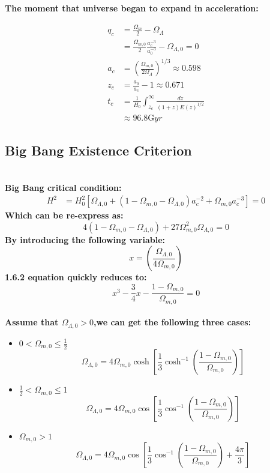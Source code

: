 \documentclass[14pt]{article}
\begin{document}
\textbf{The moment that universe began to expand in acceleration:}

\begin{align*}
    q_{c}&=\frac{\Omega_{m}}{2}-\Omega_{\Lambda}\\
    &=\frac{\Omega_{m,0}}{2}\frac{a^{-3}_{c}}{a^{-3}_{0}}-\Omega_{\Lambda,0}=0\tag{1.5.6}\\
    a_{c}&=\displaystyle(\frac{\Omega_{m,0}}{2\Omega_{\Lambda}})^{1/3} \approx 0.598 \tag{1.5.7}\\
    z_{c}&=\frac{a_{0}}{a_{c}}-1\approx 0.671 \tag{1.5.8}\\
     t_{c}&=\frac{1}{H_{0}}\int^{\infty}_{z_{c}}\displaystyle\frac{dz}{(1+z)E(z)^{1/2}}\\
      &\approx 96.8 \mathrm{G} yr\tag{1.5.9}
\end{align*}
\subsection{Big Bang Existence Criterion\cite{GRAIfPh1}}
\quad\\
\textbf{Big Bang critical condition:}
\begin{align*}
H^{2}&=H^{2}_{0}[\Omega_{\Lambda,0}+(1-\Omega_{m,0}-\Omega_{\Lambda,0})a^{-2}_{c}+\Omega_{m,0}a^{-3}_{c}]=0\tag{1.6.1}
\end{align*}
\textbf{Which can be re-express as:}
\[
4(1-\Omega_{m,0}-\Omega_{\Lambda,0})+27\Omega_{m,0}^{2}\Omega_{\Lambda,0}=0\tag{1.6.2}
\]
\textbf{By introducing the following variable:}
\[
x=\displaystyle(\frac{\Omega_{\Lambda,0}}{4\Omega_{m,0}})\tag{1.6.3}
\]
\textbf{1.6.2 equation quickly reduces to:}
\[
x^{3}-\frac{3}{4}x-\frac{1-\Omega_{m,0}}{\Omega_{m,0}}=0\tag{1.6.4}
\]
\quad\\
\textbf{Assume that $\Omega_{\Lambda,0}>0$,we can get the following three cases:}

\begin{itemize}
    \item $0<\Omega_{m,0}\le \displaystyle\frac{1}{2}$\\
    \[\Omega_{\Lambda,0}=4\Omega_{m,0}\cosh[\frac{1}{3}\cosh^{-1}(\frac{1-\Omega_{m,0}}{\Omega_{m,0}})]\tag{1.6.5}\]
    \item $\displaystyle\frac{1}{2}<\Omega_{m,0}\le 1$\\
     \[\Omega_{\Lambda,0}=4\Omega_{m,0}\cos[\frac{1}{3}\cos^{-1}(\frac{1-\Omega_{m,0}}{\Omega_{m,0}})]\tag{1.6.6}\]
    \item $\Omega_{m,0}> 1$\\
    \[\Omega_{\Lambda,0}=4\Omega_{m,0}\cos[\frac{1}{3}\cos^{-1}(\frac{1-\Omega_{m,0}}{\Omega_{m,0}})+\frac{4\pi}{3}]\tag{1.6.7}\]
\end{itemize}
\end{document}
